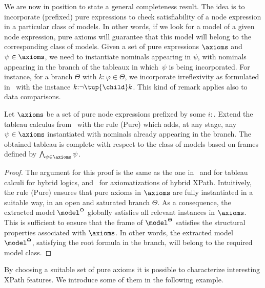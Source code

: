 We are now in position to state a general completeness result. The idea is to incorporate (prefixed) pure expressions to check satisfiability of a node expression in a particular class of models. In other words, if we look for a model of a given node expression, pure axioms will guarantee that this model will belong to the corresponding class of models. Given a set of pure expressions $\axioms$ and $\psi\in\axioms$, we need to instantiate nominals appearing in $\psi$, with nominals appearing in the branch of the tableaux in which~$\psi$ is being incorporated. For instance, for a branch $\Theta$ with $k{:}\varphi\in\Theta$, we incorporate irreflexivity as formulated in~ with the instance $k{:}\neg\tup{\child}k$. This kind of remark applies also to data comparisons. 

\begin{thm}\label{th:strong}
    \label{th:pure-completeness}
    Let $\axioms$ be a set of pure node expressions prefixed by some $i{:}$.
    Extend the tableau calculus from~ with the rule (Pure) which adds, at any stage, any $\psi\in\axioms$ instantiated with nominals already appearing in the branch. The obtained tableau is complete with respect to the class of models based on frames defined by $\bigwedge_{\psi\in\axioms} \psi$.
\end{thm}

\begin{proof}
 The argument for this proof is the same as the one in~\cite[Th.~7.2]{Blackburn00} and \cite[Prop.~3.2]{Blackburn2002BeyondPA} for tableau calculi for hybrid logics, and~\cite[Th.~3.23]{ArecesF21} for axiomatizations of hybrid XPath.  Intuitively, the rule (Pure) ensures that pure axioms in $\axioms$ are fully instantiated in a suitable way, in an open and saturated branch $\Theta$. As a consequence, the extracted model $\model^\Theta$ globally satisfies all relevant instances in $\axioms$. This is sufficient to ensure that the frame of $\model^\Theta$ satisfies the structural properties associated with $\axioms$. In 
 other words, the extracted model $\model^\Theta$, satisfying the root formula in the branch, will belong to the required model class. 
\end{proof}

By choosing a suitable set of pure axioms it is possible to characterize interesting XPath features. 
We introduce some of them in the following example.


